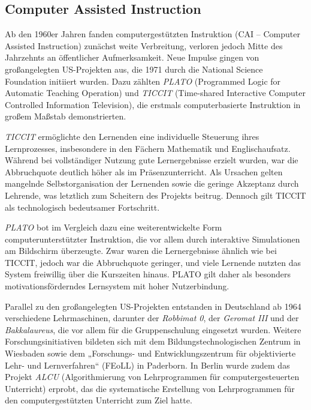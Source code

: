 \subsection{Computer Assisted Instruction}

 Ab den 1960er Jahren fanden computergestützten Instruktion (CAI – Computer Assisted Instruction) zunächst weite Verbreitung, verloren jedoch Mitte des Jahrzehnts an öffentlicher Aufmerksamkeit. Neue Impulse gingen von großangelegten US-Projekten aus, die 1971 durch die National Science Foundation initiiert wurden. Dazu zählten \textit{PLATO} (Programmed Logic for Automatic Teaching Operation) und \textit{TICCIT} (Time-shared Interactive Computer Controlled Information Television), die erstmals computerbasierte Instruktion in großem Maßstab demonstrierten.\parencite[S.~7]{niegemann_kompendium_2008}\parencite[S.~69ff]{oshea_lernen_1986}

\textit{TICCIT} ermöglichte den Lernenden eine individuelle Steuerung ihres Lernprozesses, insbesondere in den Fächern Mathematik und Englischaufsatz. Während bei vollständiger Nutzung gute Lernergebnisse erzielt wurden, war die Abbruchquote deutlich höher als im Präsenzunterricht. Als Ursachen gelten mangelnde Selbstorganisation der Lernenden sowie die geringe Akzeptanz durch Lehrende, was letztlich zum Scheitern des Projekts beitrug. Dennoch gilt TICCIT als technologisch bedeutsamer Fortschritt.\parencite[S.~71]{oshea_lernen_1986}\parencite[S.~13]{schonfeld_computerbasiertes_2006}

\textit{PLATO} bot im Vergleich dazu eine weiterentwickelte Form computerunterstützter Instruktion, die vor allem durch interaktive Simulationen am Bildschirm überzeugte. Zwar waren die Lernergebnisse ähnlich wie bei TICCIT, jedoch war die Abbruchquote geringer, und viele Lernende nutzten das System freiwillig über die Kurszeiten hinaus. PLATO gilt daher als besonders motivationsförderndes Lernsystem mit hoher Nutzerbindung.\parencite[S.~75f]{oshea_lernen_1986}\parencite[S.~14]{schonfeld_computerbasiertes_2006}

Parallel zu den großangelegten US-Projekten entstanden in Deutschland ab 1964 verschiedene Lehrmaschinen, darunter der \textit{Robbimat 0}, der \textit{Geromat III} und der \textit{Bakkalaureus}, die vor allem für die Gruppenschulung eingesetzt wurden. Weitere Forschungsinitiativen bildeten sich mit dem Bildungstechnologischen Zentrum in Wiesbaden sowie dem „Forschungs- und Entwicklungszentrum für objektivierte Lehr- und Lernverfahren“ (FEoLL) in Paderborn. In Berlin wurde zudem das Projekt \textit{ALCU} (Algorithmierung von Lehrprogrammen für computergesteuerten Unterricht) erprobt, das die systematische Erstellung von Lehrprogrammen für den computergestützten Unterricht zum Ziel hatte.\parencite[S.~10]{niegemann_kompendium_2008}\parencite[S.~11]{schonfeld_computerbasiertes_2006}

